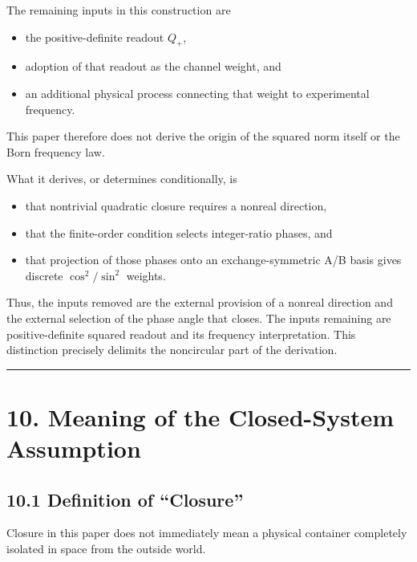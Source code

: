 \documentclass[
  a4paper,
  10pt]{article}
\providecommand{\tightlist}{%
  \setlength{\itemsep}{0pt}\setlength{\parskip}{0pt}}
\begin{document}
The remaining inputs in this construction are

\begin{itemize}
\tightlist
\item
  the positive-definite readout \(Q_+\),
\item
  adoption of that readout as the channel weight, and
\item
  an additional physical process connecting that weight to experimental
  frequency.
\end{itemize}

This paper therefore does not derive the origin of the squared norm
itself or the Born frequency law.

What it derives, or determines conditionally, is

\begin{itemize}
\tightlist
\item
  that nontrivial quadratic closure requires a nonreal direction,
\item
  that the finite-order condition selects integer-ratio phases, and
\item
  that projection of those phases onto an exchange-symmetric A/B basis
  gives discrete \(\cos^2/\sin^2\) weights.
\end{itemize}

Thus, the inputs removed are the external provision of a nonreal
direction and the external selection of the phase angle that closes. The
inputs remaining are positive-definite squared readout and its frequency
interpretation. This distinction precisely delimits the noncircular part
of the derivation.

\begin{center}\rule{0.5\linewidth}{0.5pt}\end{center}

\section{10. Meaning of the Closed-System
Assumption}\label{10-meaning-of-the-closed-system-assumption}

\subsection{10.1 Definition of
``Closure''}\label{101-definition-of-closure}

Closure in this paper does not immediately mean a physical container
completely isolated in space from the outside world.
\end{document}
